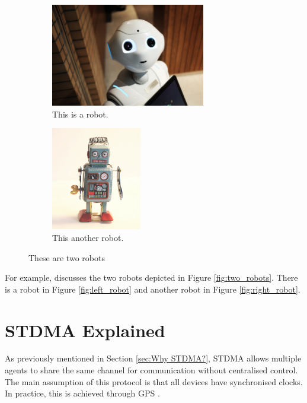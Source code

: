{\begin{figure}[htb]
\centering
\begin{subfigure}[t]{.5\textwidth}
  \centering
  \includegraphics[height=4.5cm]{figures/Robot_1.jpg}
  \caption{\label{fig:left_robot} This is a robot.}
  \label{fig:theoretical}
\end{subfigure}%
\begin{subfigure}[t]{.5\textwidth}
  \centering
  \includegraphics[height=4.5cm]{figures/Robot_2.jpg}
  \caption{\label{fig:right_robot} This another robot.}
  \label{fig:practical}
\end{subfigure}
\caption{\label{fig:two_robots} These are two robots}
\label{fig:test}
\end{figure}

For example, \cite{Robots2020} discusses the two robots depicted in Figure \ref{fig:two_robots}. There is a robot in Figure \ref{fig:left_robot} and another robot in Figure \ref{fig:right_robot}.

}


\section{STDMA Explained}

As previously mentioned in Section \ref{sec:Why STDMA?}, STDMA \cite{STDMA} allows multiple agents to 
share the same channel for communication without centralised control. The main assumption of this protocol
is that all devices have synchronised clocks. In practice, this is achieved through GPS \cite{STDMA_2}.


